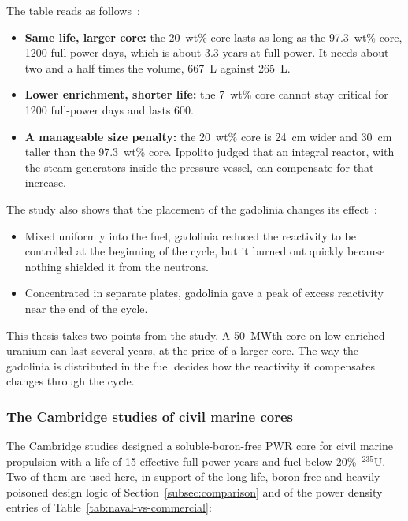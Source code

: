 The table reads as follows~\cite{ippolito_1990}:

\begin{itemize}
  \item \textbf{Same life, larger core:} the 20~wt\% core lasts as long as
        the 97.3~wt\% core, 1200 full-power days, which is about 3.3
        years at full power. It needs about two and a half times the
        volume, 667~L against 265~L.

  \item \textbf{Lower enrichment, shorter life:} the 7~wt\% core cannot
        stay critical for 1200 full-power days and lasts 600.

  \item \textbf{A manageable size penalty:} the 20~wt\% core is 24~cm wider
        and 30~cm taller than the 97.3~wt\% core. Ippolito judged that an
        integral reactor, with the steam generators inside the pressure
        vessel, can compensate for that increase.
\end{itemize}

The study also shows that the placement of the gadolinia changes its
effect~\cite{ippolito_1990}:

\begin{itemize}
  \item Mixed uniformly into the fuel, gadolinia reduced the reactivity
        to be controlled at the beginning of the cycle, but it burned out
        quickly because nothing shielded it from the neutrons.

  \item Concentrated in separate plates, gadolinia gave a peak of excess
        reactivity near the end of the cycle.
\end{itemize}

This thesis takes two points from the study. A 50~MWth core on
low-enriched uranium can last several years, at the price of a larger
core. The way the gadolinia is distributed in the fuel decides how the
reactivity it compensates changes through the cycle.

\subsubsection{The Cambridge studies of civil marine cores}
\label{subsec:academic-cambridge}

The Cambridge studies designed a soluble-boron-free PWR core for civil
marine propulsion with a life of 15 effective full-power years and fuel
below 20\%~$^{235}$U. Two of them are used here, in support of the
long-life, boron-free and heavily poisoned design logic of
Section~\ref{subsec:comparison} and of the power density entries of
Table~\ref{tab:naval-vs-commercial}:

